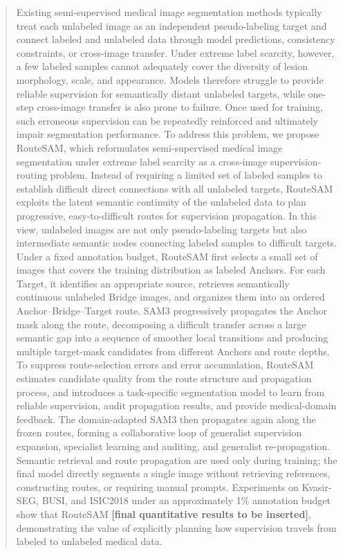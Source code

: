 \documentclass[a4paper,fleqn]{cas-dc}
\begin{document}
\fntext[1]{}


\begin{abstract}
Existing semi-supervised medical image segmentation methods typically treat each unlabeled image as an independent pseudo-labeling target and connect labeled and unlabeled data through model predictions, consistency constraints, or cross-image transfer. Under extreme label scarcity, however, a few labeled samples cannot adequately cover the diversity of lesion morphology, scale, and appearance. Models therefore struggle to provide reliable supervision for semantically distant unlabeled targets, while one-step cross-image transfer is also prone to failure. Once used for training, such erroneous supervision can be repeatedly reinforced and ultimately impair segmentation performance. To address this problem, we propose RouteSAM, which reformulates semi-supervised medical image segmentation under extreme label scarcity as a cross-image supervision-routing problem. Instead of requiring a limited set of labeled samples to establish difficult direct connections with all unlabeled targets, RouteSAM exploits the latent semantic continuity of the unlabeled data to plan progressive, easy-to-difficult routes for supervision propagation. In this view, unlabeled images are not only pseudo-labeling targets but also intermediate semantic nodes connecting labeled samples to difficult targets. Under a fixed annotation budget, RouteSAM first selects a small set of images that covers the training distribution as labeled Anchors. For each Target, it identifies an appropriate source, retrieves semantically continuous unlabeled Bridge images, and organizes them into an ordered Anchor--Bridge--Target route. SAM3 progressively propagates the Anchor mask along the route, decomposing a difficult transfer across a large semantic gap into a sequence of smoother local transitions and producing multiple target-mask candidates from different Anchors and route depths. To suppress route-selection errors and error accumulation, RouteSAM estimates candidate quality from the route structure and propagation process, and introduces a task-specific segmentation model to learn from reliable supervision, audit propagation results, and provide medical-domain feedback. The domain-adapted SAM3 then propagates again along the frozen routes, forming a collaborative loop of generalist supervision expansion, specialist learning and auditing, and generalist re-propagation. Semantic retrieval and route propagation are used only during training; the final model directly segments a single image without retrieving references, constructing routes, or requiring manual prompts. Experiments on Kvasir-SEG, BUSI, and ISIC2018 under an approximately 1\% annotation budget show that RouteSAM \textbf{[final quantitative results to be inserted]}, demonstrating the value of explicitly planning how supervision travels from labeled to unlabeled medical data.
\end{abstract}
\end{document}
